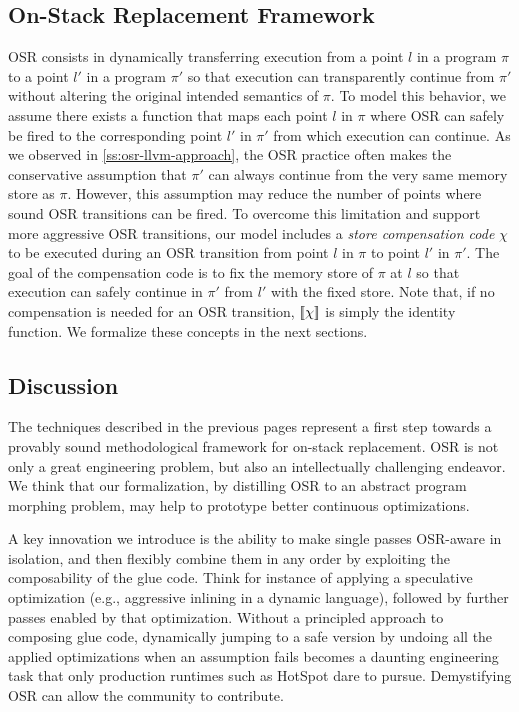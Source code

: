 


\subsection{On-Stack Replacement Framework}
\label{ss:osr-a-la-carte}

OSR consists in dynamically transferring execution from a point $l$ in a program $\pi$ to a point $l'$ in a program $\pi'$ so that execution can transparently continue from $\pi'$ without altering the original intended semantics of $\pi$. To model this behavior, we assume there exists a function that maps each point $l$ in $\pi$ where OSR can safely be fired to the corresponding point $l'$ in $\pi'$ from which execution can continue.
As we observed in \mysection\ref{ss:osr-llvm-approach}, the OSR practice often makes the conservative assumption that $\pi'$ can always continue from the very same memory store as $\pi$. However, this assumption may reduce the number of points where sound OSR transitions can be fired. To overcome this limitation and support more aggressive OSR transitions, our model includes a {\em store compensation code} $\chi$ to be executed during an OSR transition from point $l$ in $\pi$ to point $l'$ in $\pi'$. The goal of the compensation code is to fix the memory store of $\pi$ at $l$ so that execution can safely continue in $\pi'$ from $l'$ with the fixed store. Note that, if no compensation is needed for an OSR transition, $[\![\chi]\!]$ is simply the identity function. We formalize these concepts in the next sections.







\subsection{Discussion}
The techniques described in the previous pages represent a first step towards a provably sound methodological framework for on-stack replacement. OSR is not only a great engineering problem, but also an intellectually challenging endeavor. We think that our formalization, by distilling OSR to an abstract program morphing problem, may help to prototype better continuous optimizations.

A key innovation we introduce is the ability to make single passes OSR-aware in isolation, and then flexibly combine them in any order by exploiting the composability of the glue code. Think for instance of applying a speculative optimization (e.g., aggressive inlining in a dynamic language), followed by further passes enabled by that optimization. Without a principled approach to composing glue code, dynamically jumping to a safe version by undoing all the applied optimizations when an assumption fails becomes a daunting engineering task that only production runtimes such as HotSpot dare to pursue. Demystifying OSR can allow the community to contribute.

